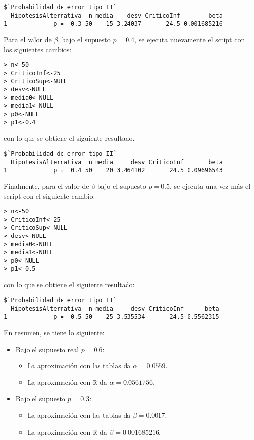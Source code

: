 \begin{solucion}
\begin{verbatim}
$`Probabilidad de error tipo II`
  HipotesisAlternativa  n media    desv CriticoInf        beta
1             p =  0.3 50    15 3.24037       24.5 0.001685216
 \end{verbatim}
 \vspace{-0.5cm}
 Para el valor de $\beta$, bajo el supuesto $p = 0.4$, se ejecuta nuevamente el script con los siguientes cambios:
 \begin{verbatim}
> n<-50
> CriticoInf<-25
> CriticoSup<-NULL
> desv<-NULL
> media0<-NULL
> media1<-NULL
> p0<-NULL
> p1<-0.4
 \end{verbatim}
 \vspace{-0.5cm}
 con lo que se obtiene el siguiente resultado.
 \begin{verbatim}
$`Probabilidad de error tipo II`
  HipotesisAlternativa  n media     desv CriticoInf       beta
1             p =  0.4 50    20 3.464102       24.5 0.09696543
 \end{verbatim}
 \vspace{-0.5cm}
 Finalmente, para el valor de $\beta$ bajo el supuesto $p = 0.5$, se ejecuta una vez m\'as el script con el siguiente cambio:
 \begin{verbatim}
> n<-50
> CriticoInf<-25
> CriticoSup<-NULL
> desv<-NULL
> media0<-NULL
> media1<-NULL
> p0<-NULL
> p1<-0.5
 \end{verbatim}
 \vspace{-0.5cm}
 con lo que se obtiene el siguiente resultado:
 \begin{verbatim}
$`Probabilidad de error tipo II`
  HipotesisAlternativa  n media     desv CriticoInf      beta
1             p =  0.5 50    25 3.535534       24.5 0.5562315
 \end{verbatim}
 \vspace{-0.5cm}
 En resumen, se tiene lo siguiente:
 \begin{itemize}
  \item Bajo el supuesto real $p = 0.6$:
  \begin{itemize}
   \item La aproximaci\'on con las tablas da $\alpha = 0.0559$.
   \item La aproximaci\'on con R da $\alpha = 0.0561756$.
  \end{itemize}
  
  \item Bajo el supuesto $p = 0.3$:
  \begin{itemize}
   \item La aproximaci\'on con las tablas da $\beta = 0.0017$.
   \item La aproximaci\'on con R da $\beta = 0.001685216$.
  \end{itemize}


\end{itemize}
\end{solucion}
